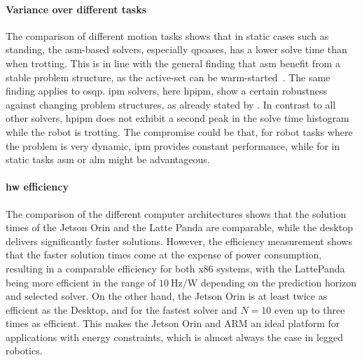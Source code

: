 \paragraph{Variance over different tasks} The comparison of different motion tasks shows that in static cases such as standing, the \gls{asm}-based solvers, especially \acrshort{qpoases}, has a lower solve time than when trotting. 
This is in line with the general finding that \gls{asm} benefit from a stable problem structure, as the active-set can be warm-started~\cite{kuindersma_efficiently_2014, bartlett_active_2000}. 
The same finding applies to \acrshort{osqp}.
\gls{ipm} solvers, here \gls{hpipm}, show a certain robustness against changing problem structures, as already stated by \cite{frison_hpipm_2020}. 
In contrast to all other solvers, \gls{hpipm} does not exhibit a second peak in the solve time histogram while the robot is trotting.
The compromise could be that, for robot tasks where the problem is very dynamic, \gls{ipm} provides constant performance, while for in static tasks \gls{asm} or \gls{alm} might be advantageous.

\paragraph{ \gls{hw} efficiency} The comparison of the different computer architectures shows that the solution times of the Jetson Orin and the Latte Panda are comparable, while the desktop delivers significantly faster solutions. 
However, the efficiency measurement shows that the faster solution times come at the expense of power consumption, resulting in a comparable efficiency for both x86 systems, with the LattePanda being more efficient in the range of $\qty{10}{\hertz\per\watt}$ depending on the prediction horizon and selected solver.
On the other hand, the Jetson Orin is at least twice as efficient as the Desktop, and for the fastest solver and $N=10$ even up to three times as efficient.
This makes the Jetson Orin and ARM an ideal platform for applications with energy constraints, which is almost always the case in legged robotics.